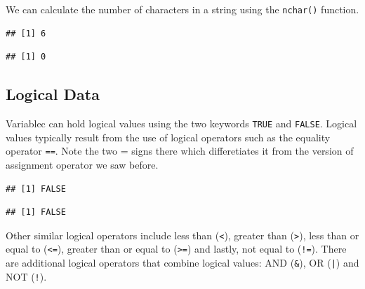 \documentclass[11pt, letterpaper, twoside]{memoir}\usepackage{knitr}
\begin{document}
We can calculate the number of characters in a string using the \texttt{nchar()} function. 
\begin{knitrout}
\color{fgcolor}\begin{kframe}
\begin{alltt}
\end{alltt}
\begin{verbatim}
## [1] 6
\end{verbatim}
\begin{alltt}
\end{alltt}
\begin{verbatim}
## [1] 0
\end{verbatim}
\end{kframe}
\end{knitrout}

\subsection{Logical Data}

Variablec can hold logical values using the two keywords \texttt{TRUE} and \texttt{FALSE}.  Logical values typically result from the use of logical operators such as the equality operator \texttt{==}. Note the two = signs there which differetiates it from the version of assignment operator we saw before.

\begin{knitrout}
\color{fgcolor}\begin{kframe}
\begin{alltt}
 \hlopt{==}   
\end{alltt}
\begin{verbatim}
## [1] FALSE
\end{verbatim}
\begin{alltt}
 \hlopt{==}   
\end{alltt}
\begin{verbatim}
## [1] FALSE
\end{verbatim}
\end{kframe}
\end{knitrout}

Other similar logical operators include less than (\texttt{<}), greater than (\texttt{>}), less than or equal to (\texttt{<=}), greater than or equal to (\texttt{>=}) and lastly, not equal to (\texttt{!=}). There are additional logical operators that combine logical values: AND (\verb|&|), OR (\texttt{|}) and NOT (\texttt{!}).
\end{document}
